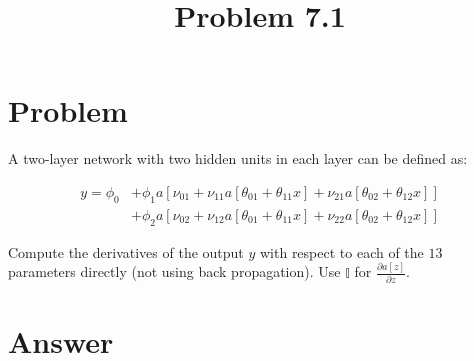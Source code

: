 \documentclass{article}
\title{Problem 7.1}
\begin{document}
\maketitle

\section{Problem}

A two-layer network with two hidden units in each layer can be defined as:

\begin{align*}
    y = \phi_{0}
    &+ \phi_{1}a
     \left[
        \nu_{01}
        + \nu_{11}a[\theta_{01} + \theta_{11}x]
        + \nu_{21}a[\theta_{02} + \theta_{12}x]
      \right]
      \\
    &+ \phi_{2}a
    \left[
        \nu_{02}
        + \nu_{12}a[\theta_{01} + \theta_{11}x]
        + \nu_{22}a[\theta_{02} + \theta_{12}x]
    \right]
\end{align*}

Compute the derivatives of the output $y$ with respect to each of the $13$ parameters directly (not using back propagation).  Use $\mathbb{I}$ for $ \frac{\partial{a[z]}}{\partial{z}}$.

\section{Answer}
\end{document}

